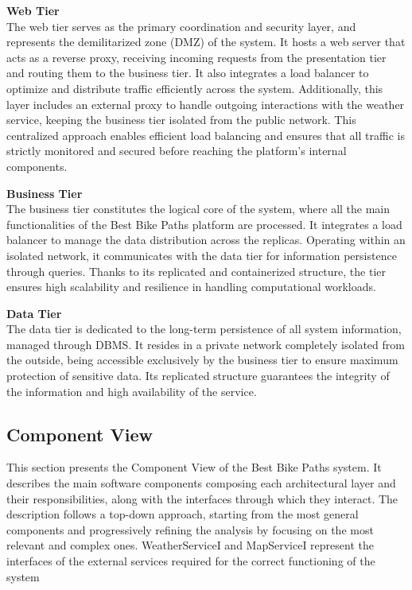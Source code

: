 \vspace{0.3cm}
\noindent
\textbf{Web Tier}\\
The web tier serves as the primary coordination and security layer, and represents the demilitarized zone (DMZ) of the system. It hosts a web server that acts as a reverse proxy, receiving incoming requests from the presentation tier and routing them to the business tier. It also integrates a load balancer to optimize and distribute traffic efficiently across the system. Additionally, this layer includes an external proxy to handle outgoing interactions with the weather service, keeping the business tier isolated from the public network. This centralized approach enables efficient load balancing and ensures that all traffic is strictly monitored and secured before reaching the platform’s internal components.

\vspace{0.3cm}
\noindent
\textbf{Business Tier}\\
The business tier constitutes the logical core of the system, where all the main functionalities of the Best Bike Paths platform are processed. It integrates a load balancer to manage the data distribution across the replicas. Operating within an isolated network, it communicates with the data tier for information persistence through queries. Thanks to its replicated and containerized structure, the tier ensures high scalability and resilience in handling computational workloads.

\vspace{0.3cm}
\noindent
\textbf{Data Tier}\\
The data tier is dedicated to the long-term persistence of all system information, managed through DBMS. It resides in a private network completely isolated from the outside, being accessible exclusively by the business tier to ensure maximum protection of sensitive data. Its replicated structure guarantees the integrity of the information and high availability of the service.

\newpage
\subsection{Component View}
This section presents the Component View of the Best Bike Paths system. It describes the main software components composing each architectural layer and their responsibilities, along with the interfaces through which they interact. The description follows a top-down approach, starting from the most general components and progressively refining the analysis by focusing on the most relevant and complex ones. WeatherServiceI and MapServiceI represent the interfaces of the external services required for the correct functioning of the system


